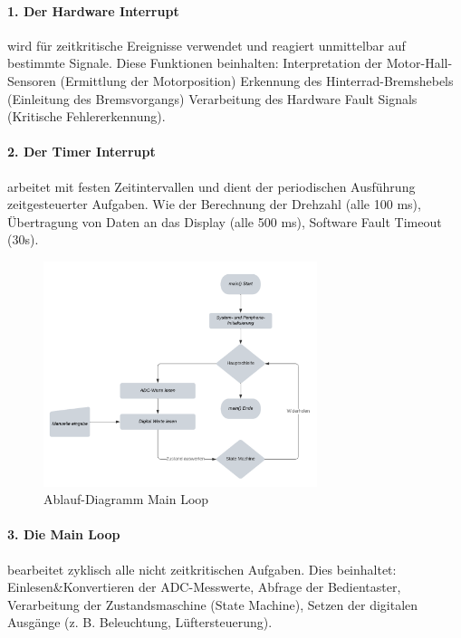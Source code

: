 \documentclass[paper=a4,11pt]{scrreprt}
\begin{document}
\paragraph{\textbf{1. Der Hardware Interrupt}} wird für zeitkritische Ereignisse verwendet und reagiert unmittelbar auf bestimmte Signale. Diese Funktionen beinhalten:
Interpretation der Motor-Hall-Sensoren (Ermittlung der Motorposition)
Erkennung des Hinterrad-Bremshebels (Einleitung des Bremsvorgangs)
Verarbeitung des Hardware Fault Signals (Kritische Fehlererkennung).\\
\paragraph{\textbf{2. Der Timer Interrupt}} arbeitet mit festen Zeitintervallen und dient der periodischen Ausführung zeitgesteuerter Aufgaben. Wie der Berechnung der Drehzahl (alle 100 ms), Übertragung von Daten an das Display (alle 500 ms), Software Fault Timeout (30s).
\begin{figure}[ht]
\begin{center}
\includegraphics[width=8cm]{Bilder/mainLoop.PNG}
\caption{Ablauf-Diagramm Main Loop}
\label{mainl}
\end{center}
\end{figure}
\paragraph{\textbf{3. Die Main Loop}} bearbeitet zyklisch alle nicht zeitkritischen Aufgaben.
Dies beinhaltet: Einlesen\&Konvertieren der ADC-Messwerte, Abfrage der Bedientaster, Verarbeitung der Zustandsmaschine (State Machine), Setzen der digitalen Ausgänge (z. B. Beleuchtung, Lüftersteuerung).
\end{document}
